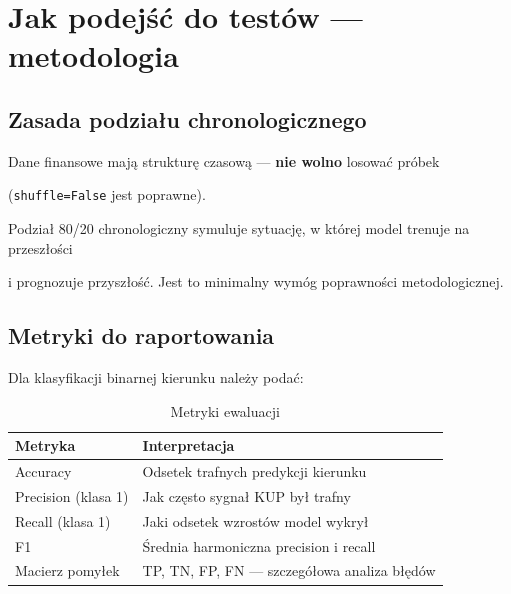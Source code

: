\documentclass[12pt,a4paper]{report}
\begin{document}
\section{Jak podejść do testów --- metodologia}



\subsection{Zasada podziału chronologicznego}



Dane finansowe mają strukturę czasową --- \textbf{nie wolno} losować próbek

(\texttt{shuffle=False} jest poprawne).

Podział 80/20 chronologiczny symuluje sytuację, w której model trenuje na przeszłości

i prognozuje przyszłość. Jest to minimalny wymóg poprawności metodologicznej.



\subsection{Metryki do raportowania}



Dla klasyfikacji binarnej kierunku należy podać:



\begin{table}[H]

\centering

\caption{Metryki ewaluacji}

\label{tab:metryki}

\begin{tabular}{@{}ll@{}}

\toprule

\textbf{Metryka} & \textbf{Interpretacja} \\

\midrule

Accuracy & Odsetek trafnych predykcji kierunku \\

Precision (klasa 1) & Jak często sygnał KUP był trafny \\

Recall (klasa 1) & Jaki odsetek wzrostów model wykrył \\

F1 & Średnia harmoniczna precision i recall \\

Macierz pomyłek & TP, TN, FP, FN --- szczegółowa analiza błędów \\

\bottomrule

\end{tabular}

\end{table}
\end{document}
